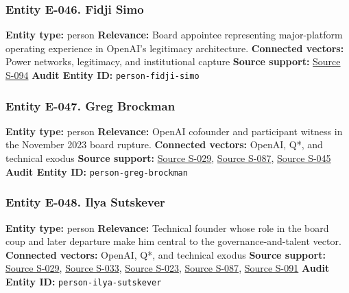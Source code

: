 \documentclass[
  american,
  11pt,
  letterpaper,
]{article}
\begin{document}
\subsubsection{Entity E-046. Fidji Simo}\label{entity-e-046-fidji-simo}

\textbf{Entity type:} person \textbf{Relevance:} Board appointee
representing major-platform operating experience in OpenAI's legitimacy
architecture. \textbf{Connected vectors:} Power networks, legitimacy,
and institutional capture \textbf{Source support:}
\hyperref[source-s-094-openai-announces-new-members-to-board-of-directors]{Source
S-094} \textbf{Audit Entity ID:} \texttt{person-fidji-simo}

\subsubsection{Entity E-047. Greg
Brockman}\label{entity-e-047-greg-brockman}

\textbf{Entity type:} person \textbf{Relevance:} OpenAI cofounder and
participant witness in the November 2023 board rupture.
\textbf{Connected vectors:} OpenAI, Q*, and technical exodus
\textbf{Source support:}
\hyperref[source-s-029-how-sam-altman-s-ouster-went-down-according-to-openai-s-ex-president]{Source
S-029},
\hyperref[source-s-087-sam-altman-returns-as-ceo-openai-has-a-new-initial-board]{Source
S-087}, \hyperref[source-s-045-musk-v-altman-4-24-cv-04722]{Source
S-045} \textbf{Audit Entity ID:} \texttt{person-greg-brockman}

\subsubsection{Entity E-048. Ilya
Sutskever}\label{entity-e-048-ilya-sutskever}

\textbf{Entity type:} person \textbf{Relevance:} Technical founder whose
role in the board coup and later departure make him central to the
governance-and-talent vector. \textbf{Connected vectors:} OpenAI, Q*,
and technical exodus \textbf{Source support:}
\hyperref[source-s-029-how-sam-altman-s-ouster-went-down-according-to-openai-s-ex-president]{Source
S-029},
\hyperref[source-s-033-openai-co-founder-ilya-sutskever-to-exit-firm]{Source
S-033},
\hyperref[source-s-023-openai-co-founder-ilya-sutskever-announces-departure-from-chatgpt-maker]{Source
S-023},
\hyperref[source-s-087-sam-altman-returns-as-ceo-openai-has-a-new-initial-board]{Source
S-087}, \hyperref[source-s-091-introducing-superalignment]{Source S-091}
\textbf{Audit Entity ID:} \texttt{person-ilya-sutskever}
\end{document}
